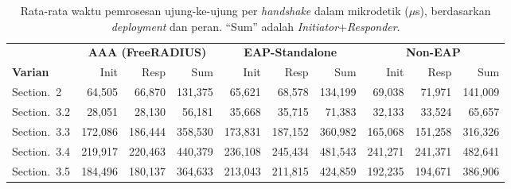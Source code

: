 \documentclass{easychair}
\newcommand{\VarSecShort}[1]{Section.~#1}
\begin{document}
\begin{table}[h]
\centering
\footnotesize
\caption{Rata-rata waktu pemrosesan ujung-ke-ujung per \emph{handshake}
dalam mikrodetik ($\mu$s), berdasarkan \emph{deployment} dan peran.
``Sum'' adalah \emph{Initiator}+\emph{Responder}.}
\label{tab:processing}
\begin{tabular}{lrrrrrrrrr}
\toprule
& \multicolumn{3}{c}{\textbf{AAA (FreeRADIUS)}} & \multicolumn{3}{c}{\textbf{EAP-Standalone}} & \multicolumn{3}{c}{\textbf{Non-EAP}} \\
\cmidrule(lr){2-4}\cmidrule(lr){5-7}\cmidrule(lr){8-10}
\textbf{Varian} & Init & Resp & Sum & Init & Resp & Sum & Init & Resp & Sum \\
\midrule
\VarSecShort{2}   &  64{,}505 &  66{,}870 & 131{,}375 &  65{,}621 &  68{,}578 & 134{,}199 &  69{,}038 &  71{,}971 & 141{,}009 \\
\VarSecShort{3.2} &  28{,}051 &  28{,}130 &  56{,}181 &  35{,}668 &  35{,}715 &  71{,}383 &  32{,}133 &  33{,}524 &  65{,}657 \\
\VarSecShort{3.3} & 172{,}086 & 186{,}444 & 358{,}530 & 173{,}831 & 187{,}152 & 360{,}982 & 165{,}068 & 151{,}258 & 316{,}326 \\
\VarSecShort{3.4} & 219{,}917 & 220{,}463 & 440{,}379 & 236{,}108 & 245{,}434 & 481{,}543 & 241{,}271 & 241{,}371 & 482{,}641 \\
\VarSecShort{3.5} & 184{,}496 & 180{,}137 & 364{,}633 & 213{,}043 & 211{,}815 & 424{,}859 & 192{,}235 & 194{,}671 & 386{,}906 \\
\bottomrule
\end{tabular}
\end{table}
\end{document}
